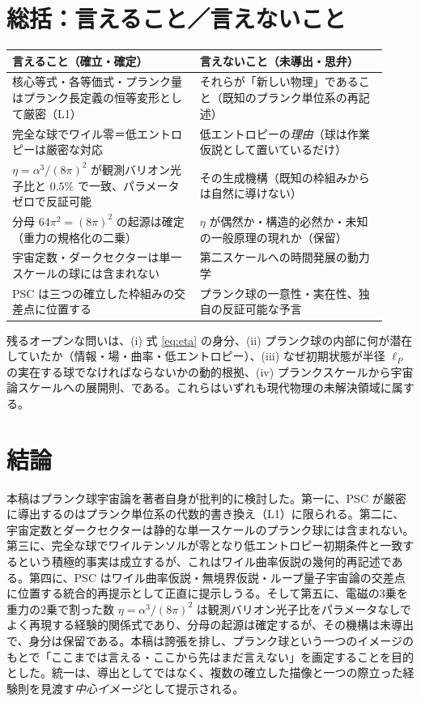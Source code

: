\documentclass[11pt,a4paper]{article}
\newcommand{\eP}{\ell_P}
\begin{document}
\section{総括：言えること／言えないこと}
\begin{center}
\small
\begin{tabular}{@{}p{0.46\linewidth}p{0.46\linewidth}@{}}
\toprule
\textbf{言えること（確立・確定）} & \textbf{言えないこと（未導出・思弁）} \\
\midrule
核心等式・各等価式・プランク量はプランク長定義の恒等変形として厳密（L1） & それらが「新しい物理」であること（既知のプランク単位系の再記述）\\
完全な球でワイル零＝低エントロピーは厳密な対応 & 低エントロピーの\emph{理由}（球は作業仮説として置いているだけ）\\
$\eta=\alpha^3/(8\pi)^2$ が観測バリオン光子比と $0.5\%$ で一致、パラメータゼロで反証可能 & その生成機構（既知の枠組みからは自然に導けない）\\
分母 $64\pi^2=(8\pi)^2$ の起源は確定（重力の規格化の二乗） & $\eta$ が偶然か・構造的必然か・未知の一般原理の現れか（保留）\\
宇宙定数・ダークセクターは単一スケールの球には含まれない & 第二スケールへの時間発展の動力学 \\
PSC は三つの確立した枠組みの交差点に位置する & プランク球の一意性・実在性、独自の反証可能な予言 \\
\bottomrule
\end{tabular}
\end{center}

残るオープンな問いは、(i) 式 \eqref{eq:eta} の身分、(ii) プランク球の内部に何が潜在していたか（情報・場・曲率・低エントロピー）、(iii) なぜ初期状態が半径 $\eP$ の実在する球でなければならないかの動的根拠、(iv) プランクスケールから宇宙論スケールへの展開則、である。これらはいずれも現代物理の未解決領域に属する。

\section{結論}
本稿はプランク球宇宙論を著者自身が批判的に検討した。第一に、PSC が厳密に導出するのはプランク単位系の代数的書き換え（L1）に限られる。第二に、宇宙定数とダークセクターは静的な単一スケールのプランク球には含まれない。第三に、完全な球でワイルテンソルが零となり低エントロピー初期条件と一致するという積極的事実は成立するが、これはワイル曲率仮説の幾何的再記述である。第四に、PSC はワイル曲率仮説・無境界仮説・ループ量子宇宙論の交差点に位置する統合的再提示として正直に提示しうる。そして第五に、電磁の3乗を重力の2乗で割った数 $\eta=\alpha^3/(8\pi)^2$ は観測バリオン光子比をパラメータなしでよく再現する経験的関係式であり、分母の起源は確定するが、その機構は未導出で、身分は保留である。本稿は誇張を排し、プランク球という一つのイメージのもとで「ここまでは言える・ここから先はまだ言えない」を画定することを目的とした。統一は、導出としてではなく、複数の確立した描像と一つの際立った経験則を見渡す\emph{中心イメージ}として提示される。
\end{document}
